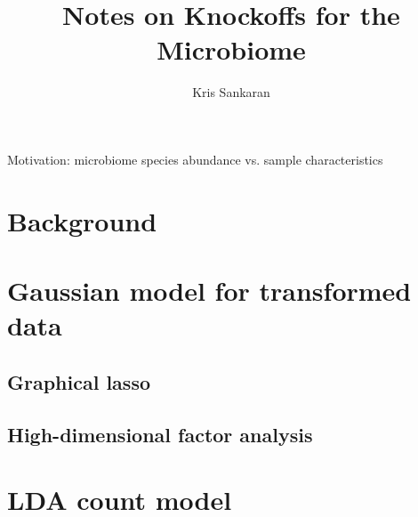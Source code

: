 \documentclass{article}
\title{Notes on Knockoffs for the Microbiome}
\author{Kris Sankaran}
\begin{document}
Motivation: microbiome species abundance vs. sample characteristics

\section{Background}
\label{sec:background}

\section{Gaussian model for transformed data}
\label{sec:mf_gaussian_model}

\subsection{Graphical lasso}
\label{subsec:graphical_lasso}


\subsection{High-dimensional factor analysis}
\label{subsec:factor_analysis}

\section{LDA count model}
\label{sec:lda_count_model}
\end{document}
